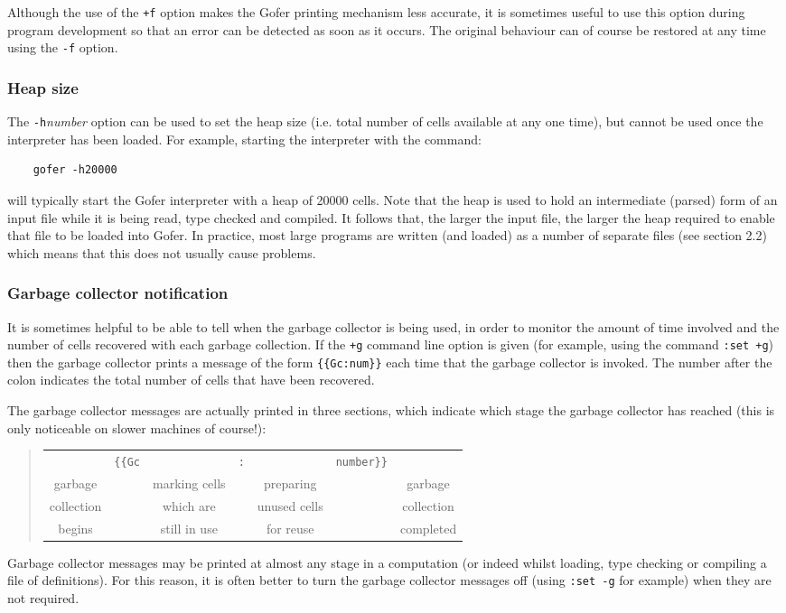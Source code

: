 Although the use of the \verb"+f" option makes the Gofer printing mechanism
less accurate, it is sometimes useful to use this option during program
development so that an error can be detected as soon as it occurs.  The
original behaviour can of course be restored at any time using the \verb"-f"
option.


\subsubsection{Heap size}
The \verb"-h"{\em number} option can be used to set the heap size 
(i.e. total number
of cells available at any one time), but cannot be used once the
interpreter has been loaded.  For example, starting the interpreter
with the command:
\begin{verbatim}
    gofer -h20000
\end{verbatim}
will typically start the Gofer interpreter with a heap of 20000 cells.
Note that the heap is used to hold an intermediate (parsed) form of an
input file while it is being read, type checked and compiled.  It
follows that, the larger the input file, the larger the heap required
to enable that file to be loaded into Gofer.  In practice, most large
programs are written (and loaded) as a number of separate files (see
section 2.2) which means that this does not usually cause problems.


\subsubsection{Garbage collector notification}
It is sometimes helpful to be able to tell when the garbage collector
is being used, in order to monitor the amount of time involved and the
number of cells recovered with each garbage collection.  If the \verb"+g"
command line option is given (for example, using the command \verb":set +g")
then the garbage collector prints a message of the form \verb"{{Gc:num}}" each
time that the garbage collector is invoked.  The number after the colon
indicates the total number of cells that have been recovered.

The garbage collector messages are actually printed in three sections,
which indicate which stage the garbage collector has reached (this is
only noticeable on slower machines of course!):
\begin{quote}
\begin{tabular}{ccccccc}
            & \verb"{{Gc" &&   \verb":" &&             \verb"number}}" \\
   garbage    &&   marking cells  &&    preparing     &&      garbage    \\
   collection &&     which are    &&   unused cells   &&      collection \\
   begins     &&    still in use  &&    for reuse     &&      completed
\end{tabular}
\end{quote}
Garbage collector messages may be printed at almost any stage in a
computation (or indeed whilst loading, type checking or compiling a
file of definitions).  For this reason, it is often better to turn
the garbage collector messages off (using \verb":set -g" for example) when
they are not required.


